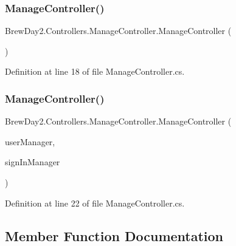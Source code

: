 \subsubsection{\texorpdfstring{Manage\+Controller()}{ManageController()}\hspace{0.1cm}{\footnotesize\ttfamily [1/2]}}
{\footnotesize\ttfamily Brew\+Day2.\+Controllers.\+Manage\+Controller.\+Manage\+Controller (\begin{DoxyParamCaption}{ }\end{DoxyParamCaption})}



Definition at line 18 of file Manage\+Controller.\+cs.

\mbox{\label{class_brew_day2_1_1_controllers_1_1_manage_controller_ab2152e5900c16e82846b991765fdaccc}} 
\subsubsection{\texorpdfstring{Manage\+Controller()}{ManageController()}\hspace{0.1cm}{\footnotesize\ttfamily [2/2]}}
{\footnotesize\ttfamily Brew\+Day2.\+Controllers.\+Manage\+Controller.\+Manage\+Controller (\begin{DoxyParamCaption}\item[{\mbox{\hyperlink{class_brew_day2_1_1_application_user_manager}{Application\+User\+Manager}}}]{user\+Manager,  }\item[{\mbox{\hyperlink{class_brew_day2_1_1_application_sign_in_manager}{Application\+Sign\+In\+Manager}}}]{sign\+In\+Manager }\end{DoxyParamCaption})}



Definition at line 22 of file Manage\+Controller.\+cs.



\subsection{Member Function Documentation}
\mbox{\label{class_brew_day2_1_1_controllers_1_1_manage_controller_abcf4d61a14f8e5c0f9b440b1160f567e}} 
